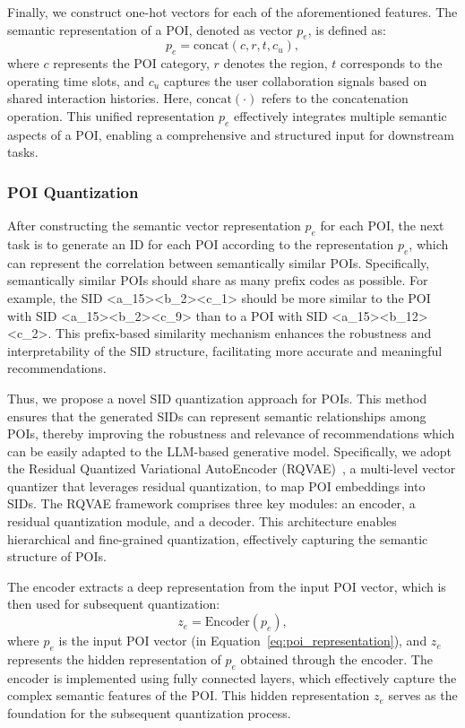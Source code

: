 Finally, we construct one-hot vectors for each of the aforementioned features.
The semantic representation of a POI, denoted as vector $ p_e $, is defined as:
\begin{equation}
\label{eq:poi_representation}
    p_e = \text{concat}(c, r, t, c_u),
\end{equation}
where $ c $ represents the POI category, $ r $ denotes the region, $ t $ corresponds to the operating time slots, and $ c_u $ captures the user collaboration signals based on shared interaction histories. 
Here, $ \text{concat}(\cdot) $ refers to the concatenation operation. 
This unified representation $ p_e $ effectively integrates multiple semantic aspects of a POI, enabling a comprehensive and structured input for downstream tasks.

\subsubsection{POI Quantization} 

After constructing the semantic vector representation $ p_e $ for each POI, the next task is to generate an ID for each POI according to the representation $ p_e $, which can represent the correlation between semantically similar POIs. 
Specifically, semantically similar POIs should share as many prefix codes as possible. 
For example, the SID <a\_15><b\_2><c\_1> should be more similar to the POI with SID <a\_15><b\_2><c\_9> than to a POI with SID <a\_15><b\_12><c\_2>. 
This prefix-based similarity mechanism enhances the robustness and interpretability of the SID structure, facilitating more accurate and meaningful recommendations.

Thus, we propose a novel SID quantization approach for POIs. 
This method ensures that the generated SIDs can represent semantic relationships among POIs, thereby improving the robustness and relevance of recommendations which can be easily adapted to the LLM-based generative model. 
Specifically, we adopt the Residual Quantized Variational AutoEncoder (RQVAE)~\cite{zeghidour2021soundstream}, a multi-level vector quantizer that leverages residual quantization, to map POI embeddings into SIDs. 
The RQVAE framework comprises three key modules: an encoder, a residual quantization module, and a decoder. 
This architecture enables hierarchical and fine-grained quantization, effectively capturing the semantic structure of POIs.

The encoder extracts a deep representation from the input POI vector, which is then used for subsequent quantization:
\begin{equation}
    z_e = \text{Encoder}(p_e),
\end{equation}
where $ p_e $ is the input POI vector (in Equation~\ref{eq:poi_representation}), and $ z_e $ represents the hidden representation of $ p_e $ obtained through the encoder. 
The encoder is implemented using fully connected layers, which effectively capture the complex semantic features of the POI. 
This hidden representation $ z_e $ serves as the foundation for the subsequent quantization process.

